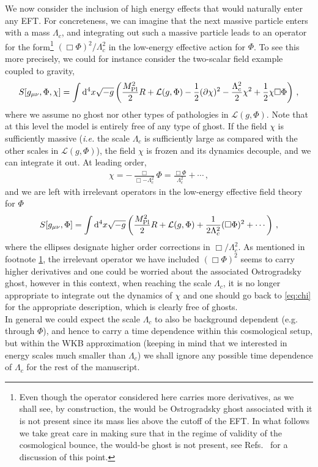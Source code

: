 \documentclass[12pt]{article}
\def\ba{\begin{eqnarray}}
\def\ea{\end{eqnarray}}
\def\mpl{M_{\rm Pl}}
\def\d{\mathrm{d}}
\def\L{\mathcal{L}}
\def\({\left(}
\def\){\right)}
\def\ie{{\it i.e. }}
\def\p{\partial}
\def\mn{_{\mu \nu}}
\def\p{\partial}
\begin{document}
We now consider the inclusion of high energy effects that would naturally enter any EFT. For concreteness, we can imagine that the next massive particle enters with a mass $\Lambda_c$, and integrating out such a massive particle leads to an operator for the form\footnote{\label{foot:ghost}Even though the operator considered here carries more derivatives, as we shall see,
by construction, the would be Ostrogradsky ghost associated with it is not present since its mass lies above the cutoff of the EFT. In what follows we take great care in making sure that in the regime of validity of the cosmological bounce, the would-be ghost is not present, see Refs.~\cite{Burgess:2007pt,Creminelli:2010qf,deRham:2014fha} for a discussion of this point.} $(\Box \Phi)^2/\Lambda_c^2$ in the low-energy effective action for $\Phi$. To see this more precisely, we could for instance consider the two-scalar field example coupled to gravity,
\ba
\label{eq:chi}
S[g\mn, \Phi, \chi]=\int \d^4x \sqrt{-g}\(\frac{\mpl^2}{2}R +\L(g, \Phi)  -\frac 12 (\p \chi)^2 -\frac {\Lambda_c^2}{2} \chi^2 +\frac 12 \chi \Box \Phi\)\,,
\ea
where we assume no ghost nor other types of pathologies in $\L(g, \Phi)$. Note that at this level the model is entirely free of any type of  ghost.
If the field $\chi$ is sufficiently massive (\ie the scale $\Lambda_c$ is sufficiently large as compared with the other scales in $\L(g, \Phi)$), the field $\chi$ is frozen and its dynamics decouple, and we can integrate it out. At leading order,
\ba
\chi=-\frac{\Box}{\Box-\Lambda_c^2}\Phi= \frac{\Box \Phi}{\Lambda_c^2}+\cdots\,,
\ea
and we are left with irrelevant operators in the low-energy effective field theory for $\Phi$
\ba
S[g\mn, \Phi]=\int \d^4 x \sqrt{-g}\(\frac{\mpl^2}{2}R +\L(g, \Phi)  +\frac{1}{2\Lambda_c^2} (\Box \Phi)^2+\cdots \) \,,
\ea
where the ellipses designate higher order corrections in $\Box/\Lambda_c^2$. As mentioned in footnote \ref{foot:ghost}, the irrelevant operator we have included $(\Box \Phi)^2$ seems to carry higher derivatives and one could be worried about the associated Ostrogradsky ghost, however in this context, when reaching the scale $\Lambda_c$, it is no longer appropriate to integrate out the dynamics of $\chi$ and one should go back to \eqref{eq:chi} for the appropriate description, which is clearly free of ghosts. \\

In general we could expect the scale $\Lambda_c$ to also be background dependent (e.g. through $\Phi$), and hence to carry a time dependence within this cosmological setup, but within the WKB approximation (keeping in mind that we interested in energy scales much smaller than $\Lambda_c$) we shall ignore any possible time dependence of $\Lambda_c$ for the rest of the manuscript. \\
\end{document}

